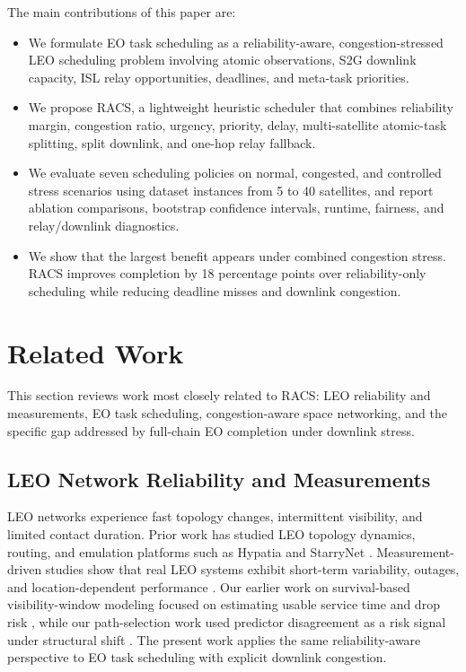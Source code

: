\documentclass[conference]{IEEEtran}
\begin{document}
The main contributions of this paper are:
\begin{itemize}
\item We formulate EO task scheduling as a reliability-aware, congestion-stressed LEO scheduling problem involving atomic observations, S2G downlink capacity, ISL relay opportunities, deadlines, and meta-task priorities.
\item We propose RACS, a lightweight heuristic scheduler that combines reliability margin, congestion ratio, urgency, priority, delay, multi-satellite atomic-task splitting, split downlink, and one-hop relay fallback.
\item We evaluate seven scheduling policies on normal, congested, and controlled stress scenarios using dataset instances from 5 to 40 satellites, and report ablation comparisons, bootstrap confidence intervals, runtime, fairness, and relay/downlink diagnostics.
\item We show that the largest benefit appears under combined congestion stress. RACS improves completion by 18 percentage points over reliability-only scheduling while reducing deadline misses and downlink congestion.
\end{itemize}

\section{Related Work}
This section reviews work most closely related to RACS: LEO reliability and measurements, EO task scheduling, congestion-aware space networking, and the specific gap addressed by full-chain EO completion under downlink stress.

\subsection{LEO Network Reliability and Measurements}
LEO networks experience fast topology changes, intermittent visibility, and limited contact duration. Prior work has studied LEO topology dynamics, routing, and emulation platforms such as Hypatia and StarryNet \cite{bhattacherjee2018space,kassing2020hypatia,lai2023starrynet}. Measurement-driven studies show that real LEO systems exhibit short-term variability, outages, and location-dependent performance \cite{mohan2024starlink,zhao2024lens}. Our earlier work on survival-based visibility-window modeling focused on estimating usable service time and drop risk \cite{deepak_visibility}, while our path-selection work used predictor disagreement as a risk signal under structural shift \cite{deepak_disagreement}. The present work applies the same reliability-aware perspective to EO task scheduling with explicit downlink congestion.
\end{document}

